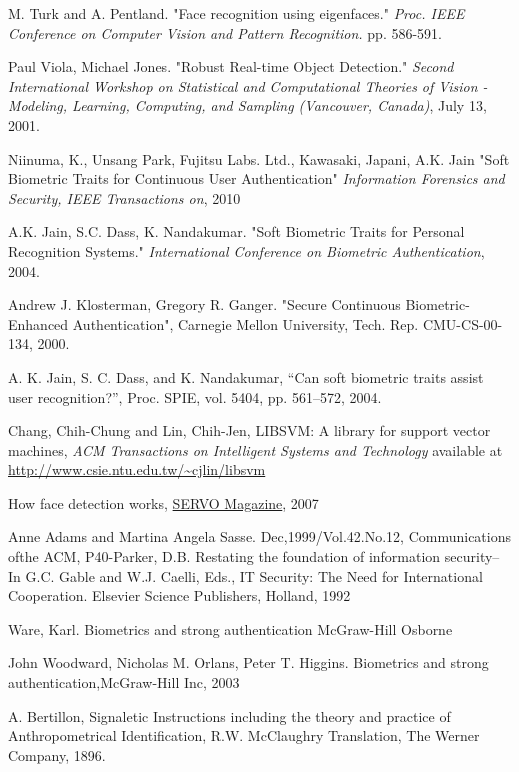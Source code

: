 \begin{thebibliography}{77}
 M. Turk and A. Pentland.
"Face recognition using eigenfaces."
\emph{Proc. IEEE Conference on Computer Vision and Pattern Recognition.} pp. 586-591.

Paul Viola, Michael Jones.
"Robust Real-time Object Detection."
\emph{Second International Workshop on Statistical and Computational Theories of Vision - Modeling, Learning, Computing, and Sampling (Vancouver, Canada)}, July 13, 2001.

 Niinuma, K., Unsang Park, Fujitsu Labs. Ltd., Kawasaki, Japani, A.K. Jain
"Soft Biometric Traits for Continuous User Authentication" 
\emph{Information Forensics and Security, IEEE Transactions on}, 2010

A.K. Jain, S.C. Dass, K. Nandakumar.
"Soft Biometric Traits for Personal Recognition Systems."
\emph{International Conference on Biometric Authentication}, 2004.

Andrew J. Klosterman, Gregory R. Ganger.
"Secure Continuous Biometric-Enhanced Authentication", 
Carnegie Mellon University, Tech. Rep. CMU-CS-00-134, 2000.

A. K. Jain, S. C. Dass, and K. Nandakumar,
“Can soft biometric traits assist user recognition?”,
Proc. SPIE, vol. 5404, pp. 561–572, 2004.

Chang, Chih-Chung and Lin, Chih-Jen,
LIBSVM: A library for support vector machines,
\emph{ACM Transactions on Intelligent Systems and Technology}
available at \url{http://www.csie.ntu.edu.tw/~cjlin/libsvm}

How face detection works,
\href{http://www.servomagazine.com/}{SERVO Magazine}, 2007

Anne Adams and Martina Angela Sasse.
Dec,1999/Vol.42.No.12, Communications ofthe ACM,
P40-Parker, D.B. Restating the foundation of information security-- In G.C.
Gable and W.J. Caelli, Eds., IT Security: The Need for International Cooperation.
Elsevier Science Publishers, Holland, 1992

 Ware, Karl.
Biometrics and strong authentication McGraw-Hill Osborne

John Woodward, Nicholas M. Orlans, Peter T. Higgins.
Biometrics and strong authentication,McGraw-Hill Inc, 2003

A. Bertillon,
Signaletic Instructions including the theory and practice of Anthropometrical Identification, R.W.
McClaughry Translation, The Werner Company, 1896.


\end{thebibliography}
